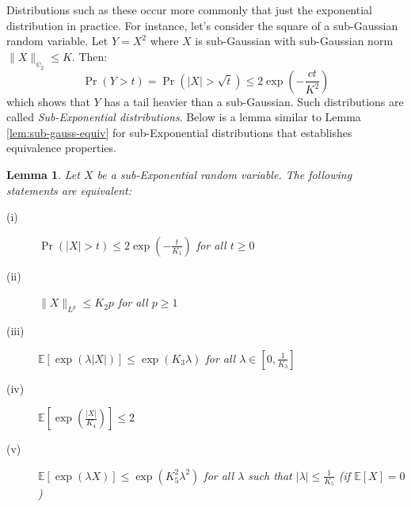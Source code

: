 \documentclass{article}
\newtheorem{lemma}{Lemma}[subsection]
\theoremstyle{remark}
\newcommand{\Exp}{\mathbb{E}}
\begin{document}
Distributions such as these occur more commonly that just the exponential distribution in practice. For instance, let's consider the square of a sub-Gaussian random variable. Let \(Y = X^{2}\) where \(X\) is sub-Gaussian with sub-Gaussian norm \(\|X\|_{\psi_{2}} \leq K\). Then:
\begin{equation*}
\Pr(Y > t) = \Pr(|X| > \sqrt{t}) \leq 2\exp\left(-\frac{ct}{K^{2}}\right)
\end{equation*}
which shows that \(Y\) has a tail heavier than a sub-Gaussian. Such distributions are called \emph{Sub-Exponential distributions}. Below is a lemma similar to Lemma \ref{lem:sub-gauss-equiv} for sub-Exponential distributions that establishes equivalence properties.

\begin{lemma}
Let \(X\) be a sub-Exponential random variable. The following statements are equivalent:
\begin{description}
\item [(i)] \(\Pr(|X| > t) \leq 2\exp\left(-\frac{t}{K_{1}}\right)\) for all \(t \geq 0\)
\item [(ii)] \(\|X\|_{L^{p}} \leq K_{2}p\) for all \(p \geq 1\)
\item [(iii)] \(\Exp[\exp(\lambda|X|)] \leq \exp(K_{3}\lambda)\) for all \(\lambda \in \left[0, \frac{1}{K_{3}}\right]\)
\item [(iv)] \(\Exp\left[\exp\left(\frac{|X|}{K_{4}}\right)\right] \leq 2\)
\item [(v)] \(\Exp[\exp(\lambda X)] \leq \exp(K_{5}^{2}\lambda^{2})\) for all \(\lambda\) such that \(|\lambda| \leq \frac{1}{K_{5}}\) (if \(\Exp[X] = 0\))
\end{description}
\end{lemma}
\end{document}

